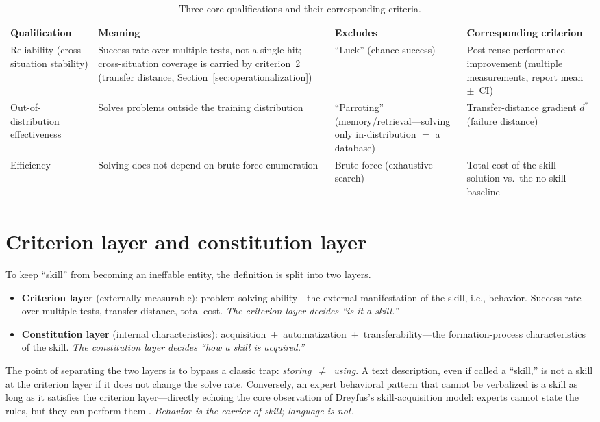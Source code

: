 \documentclass[11pt]{article}
\begin{document}
\begin{table}[h]
\centering
\begin{tabular}{@{}p{}p{}p{}p{}@{}}
\toprule
Qualification & Meaning & Excludes & Corresponding criterion \\
\midrule
Reliability (cross-situation stability) & Success rate over multiple tests, not a single hit; cross-situation coverage is carried by criterion~2 (transfer distance, Section~\ref{sec:operationalization}) & ``Luck'' (chance success) & Post-reuse performance improvement (multiple measurements, report mean~$\pm$~CI) \\
\addlinespace
Out-of-distribution effectiveness & Solves problems outside the training distribution & ``Parroting'' (memory/retrieval---solving only in-distribution $=$ a database) & Transfer-distance gradient $d^{*}$ (failure distance) \\
\addlinespace
Efficiency & Solving does not depend on brute-force enumeration & Brute force (exhaustive search) & Total cost of the skill solution vs.\ the no-skill baseline \\
\bottomrule
\end{tabular}
\caption{Three core qualifications and their corresponding criteria.}
\label{tab:qualifications}
\end{table}

\section{Criterion layer and constitution layer}
\label{sec:layers}

To keep ``skill'' from becoming an ineffable entity, the definition is split into two layers.

\begin{itemize}
\item \textbf{Criterion layer} (externally measurable): problem-solving ability---the external manifestation of the skill, i.e., behavior. Success rate over multiple tests, transfer distance, total cost. \emph{The criterion layer decides ``is it a skill.''}
\item \textbf{Constitution layer} (internal characteristics): acquisition~$+$~automatization~$+$~transferability---the formation-process characteristics of the skill. \emph{The constitution layer decides ``how a skill is acquired.''}
\end{itemize}

The point of separating the two layers is to bypass a classic trap: \emph{storing~$\neq$~using}. A text description, even if called a ``skill,'' is not a skill at the criterion layer if it does not change the solve rate. Conversely, an expert behavioral pattern that cannot be verbalized is a skill as long as it satisfies the criterion layer---directly echoing the core observation of Dreyfus's skill-acquisition model: experts cannot state the rules, but they can perform them \cite{dreyfus1980}. \emph{Behavior is the carrier of skill; language is not.}
\end{document}
